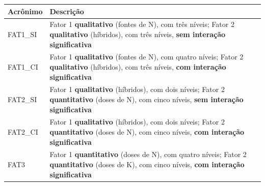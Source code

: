 \documentclass[
]{book}
\numberwithin{equation}{section}
\begin{document}
\begin{longtable}[]{@{}ll@{}}
\toprule
\begin{minipage}[b]{0.10\columnwidth}\raggedright
Acrônimo\strut
\end{minipage} & \begin{minipage}[b]{0.84\columnwidth}\raggedright
Descrição\strut
\end{minipage}\tabularnewline
\midrule
\endhead
\begin{minipage}[t]{0.10\columnwidth}\raggedright
FAT1\_SI\strut
\end{minipage} & \begin{minipage}[t]{0.84\columnwidth}\raggedright
Fator 1 \textbf{qualitativo} (fontes de N), com três níveis; Fator 2 \textbf{qualitativo} (híbridos), com três níveis, \textbf{sem interação significativa}\strut
\end{minipage}\tabularnewline
\begin{minipage}[t]{0.10\columnwidth}\raggedright
FAT1\_CI\strut
\end{minipage} & \begin{minipage}[t]{0.84\columnwidth}\raggedright
Fator 1 \textbf{qualitativo} (fontes de N), com quatro níveis; Fator 2 \textbf{qualitativo} (híbridos), com três níveis, \textbf{com interação significativa}\strut
\end{minipage}\tabularnewline
\begin{minipage}[t]{0.10\columnwidth}\raggedright
FAT2\_SI\strut
\end{minipage} & \begin{minipage}[t]{0.84\columnwidth}\raggedright
Fator 1 \textbf{qualitativo} (híbridos), com dois níveis; Fator 2 \textbf{quantitativo} (doses de N), com cinco níveis, \textbf{sem interação significativa}\strut
\end{minipage}\tabularnewline
\begin{minipage}[t]{0.10\columnwidth}\raggedright
FAT2\_CI\strut
\end{minipage} & \begin{minipage}[t]{0.84\columnwidth}\raggedright
Fator 1 \textbf{qualitativo} (híbridos), com dois níveis; Fator 2 \textbf{quantitativo} (doses de N), com cinco níveis, \textbf{com interação significativa}\strut
\end{minipage}\tabularnewline
\begin{minipage}[t]{0.10\columnwidth}\raggedright
FAT3\strut
\end{minipage} & \begin{minipage}[t]{0.84\columnwidth}\raggedright
Fator 1 \textbf{quantitativo} (doses de N), com quatro níveis; Fator 2 \textbf{quantitativo} (doses de K), com cinco níveis, \textbf{com interação significativa}\strut
\end{minipage}\tabularnewline
\bottomrule
\end{longtable}
\end{document}
